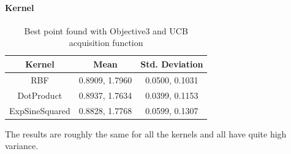 \paragraph*{Kernel}
\begin{table}[H]
    \centering
    \begin{tabular}{|c|c|c|}
        \textbf{Kernel} & \textbf{Mean}  & \textbf{Std. Deviation} \\\hline
        RBF             & 0.8909, 1.7960 & 0.0500, 0.1031          \\
        DotProduct      & 0.8937, 1.7634 & 0.0399, 0.1153          \\
        ExpSineSquared  & 0.8828, 1.7768 & 0.0599, 0.1307          \\
        \hline
    \end{tabular}
    \caption{Best point found with Objective3 and UCB acquisition function}
    \label{tab:kernel}
\end{table}
The results are roughly the same for all the kernels and all have quite high variance.

